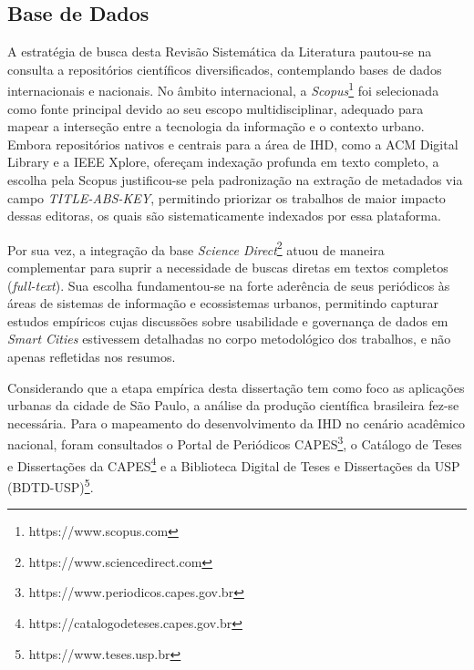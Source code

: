 \documentclass[
	12pt,				%
	oneside,			%
	a4paper,			%
	english,			%
	brazil				%
	]{abntex2ppgsi}
\begin{document}

\subsection{Base de Dados}

    A estratégia de busca desta Revisão Sistemática da Literatura pautou-se na consulta a repositórios científicos diversificados, contemplando bases de dados internacionais e nacionais. No âmbito internacional, a \emph{Scopus}\footnote{https://www.scopus.com} foi selecionada como fonte principal devido ao seu escopo multidisciplinar, adequado para mapear a interseção entre a tecnologia da informação e o contexto urbano. Embora repositórios nativos e centrais para a área de IHD, como a ACM Digital Library e a IEEE Xplore, ofereçam indexação profunda em texto completo, a escolha pela Scopus justificou-se pela padronização na extração de metadados via campo \textit{TITLE-ABS-KEY}, permitindo priorizar os trabalhos de maior impacto dessas editoras, os quais são sistematicamente indexados por essa plataforma.

    Por sua vez, a integração da base \emph{Science Direct}\footnote{https://www.sciencedirect.com} atuou de maneira complementar para suprir a necessidade de buscas diretas em textos completos (\textit{full-text}). Sua escolha fundamentou-se na forte aderência de seus periódicos às áreas de sistemas de informação e ecossistemas urbanos, permitindo capturar estudos empíricos cujas discussões sobre usabilidade e governança de dados em \textit{Smart Cities} estivessem detalhadas no corpo metodológico dos trabalhos, e não apenas refletidas nos resumos.

    Considerando que a etapa empírica desta dissertação tem como foco as aplicações urbanas da cidade de São Paulo, a análise da produção científica brasileira fez-se necessária. Para o mapeamento do desenvolvimento da IHD no cenário acadêmico nacional, foram consultados o Portal de Periódicos CAPES\footnote{https://www.periodicos.capes.gov.br}, o Catálogo de Teses e Dissertações da CAPES\footnote{https://catalogodeteses.capes.gov.br} e a Biblioteca Digital de Teses e Dissertações da USP (BDTD-USP)\footnote{https://www.teses.usp.br}.
    
\end{document}
